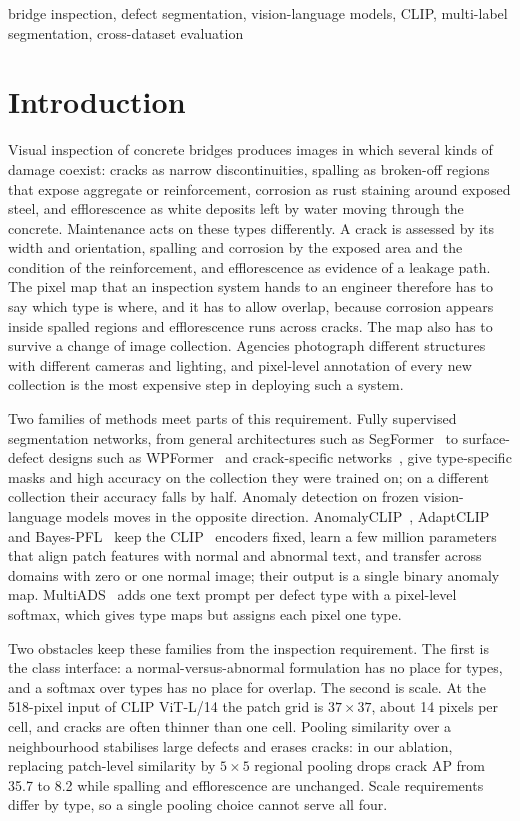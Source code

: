 \documentclass[conference]{IEEEtran}
\begin{document}
\begin{IEEEkeywords}
bridge inspection, defect segmentation, vision-language models, CLIP, multi-label segmentation, cross-dataset evaluation
\end{IEEEkeywords}

\section{Introduction}
Visual inspection of concrete bridges produces images in which several kinds of damage coexist: cracks as narrow discontinuities, spalling as broken-off regions that expose aggregate or reinforcement, corrosion as rust staining around exposed steel, and efflorescence as white deposits left by water moving through the concrete. Maintenance acts on these types differently. A crack is assessed by its width and orientation, spalling and corrosion by the exposed area and the condition of the reinforcement, and efflorescence as evidence of a leakage path. The pixel map that an inspection system hands to an engineer therefore has to say which type is where, and it has to allow overlap, because corrosion appears inside spalled regions and efflorescence runs across cracks. The map also has to survive a change of image collection. Agencies photograph different structures with different cameras and lighting, and pixel-level annotation of every new collection is the most expensive step in deploying such a system.

Two families of methods meet parts of this requirement. Fully supervised segmentation networks, from general architectures such as SegFormer~\cite{segformer} to surface-defect designs such as WPFormer~\cite{wpformer} and crack-specific networks~\cite{scsegamba}, give type-specific masks and high accuracy on the collection they were trained on; on a different collection their accuracy falls by half. Anomaly detection on frozen vision-language models moves in the opposite direction. AnomalyCLIP~\cite{anomalyclip}, AdaptCLIP~\cite{adaptclip} and Bayes-PFL~\cite{bayespfl} keep the CLIP~\cite{clip} encoders fixed, learn a few million parameters that align patch features with normal and abnormal text, and transfer across domains with zero or one normal image; their output is a single binary anomaly map. MultiADS~\cite{multiads} adds one text prompt per defect type with a pixel-level softmax, which gives type maps but assigns each pixel one type.

Two obstacles keep these families from the inspection requirement. The first is the class interface: a normal-versus-abnormal formulation has no place for types, and a softmax over types has no place for overlap. The second is scale. At the 518-pixel input of CLIP ViT-L/14 the patch grid is $37\times37$, about 14 pixels per cell, and cracks are often thinner than one cell. Pooling similarity over a neighbourhood stabilises large defects and erases cracks: in our ablation, replacing patch-level similarity by $5\times5$ regional pooling drops crack AP from 35.7 to 8.2 while spalling and efflorescence are unchanged. Scale requirements differ by type, so a single pooling choice cannot serve all four.
\end{document}
